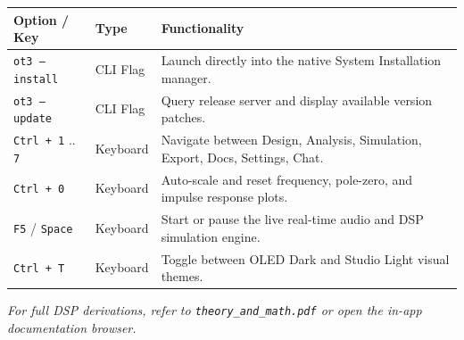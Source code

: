 \documentclass[11pt,a4paper]{article}
\begin{document}
\begin{center}
\small
\begin{tabular}{llp{7.5cm}}
\toprule
\textbf{Option / Key} & \textbf{Type} & \textbf{Functionality} \\
\midrule
\texttt{ot3 --install} & CLI Flag & Launch directly into the native System Installation manager. \\
\texttt{ot3 --update} & CLI Flag & Query release server and display available version patches. \\
\texttt{Ctrl + 1} .. \texttt{7} & Keyboard & Navigate between Design, Analysis, Simulation, Export, Docs, Settings, Chat. \\
\texttt{Ctrl + 0} & Keyboard & Auto-scale and reset frequency, pole-zero, and impulse response plots. \\
\texttt{F5} / \texttt{Space} & Keyboard & Start or pause the live real-time audio and DSP simulation engine. \\
\texttt{Ctrl + T} & Keyboard & Toggle between OLED Dark and Studio Light visual themes. \\
\bottomrule
\end{tabular}
\end{center}

\vspace{12pt}
\noindent\textit{For full DSP derivations, refer to \texttt{theory\_and\_math.pdf} or open the in-app documentation browser.}
\end{document}
